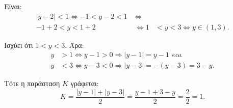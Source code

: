 
\begin{alist}
\item Είναι:
\begin{align*}
|y - 2| < 1 \Leftrightarrow -1 < y - 2 < 1 \ &\Leftrightarrow \\
-1 + 2 < y < 1 + 2 \ &\Leftrightarrow 1 &< y < 3 \Leftrightarrow y \in (1, 3).
\end{align*}

\item Ισχύει ότι $1 < y < 3$. Άρα:
\begin{align*}
y &> 1 \Leftrightarrow y - 1 > 0 \Rightarrow |y - 1| = y - 1\text{ και} \\
y &< 3 \Leftrightarrow y - 3 < 0 \Rightarrow |y - 3| = -(y - 3) = 3 - y.
\end{align*}

Τότε η παράσταση $K$ γράφεται:
\[K = \dfrac{|y - 1| + |y - 3|}{2} = \dfrac{y - 1 + 3 - y}{2} = \dfrac{2}{2} = 1.\]
\end{alist}

